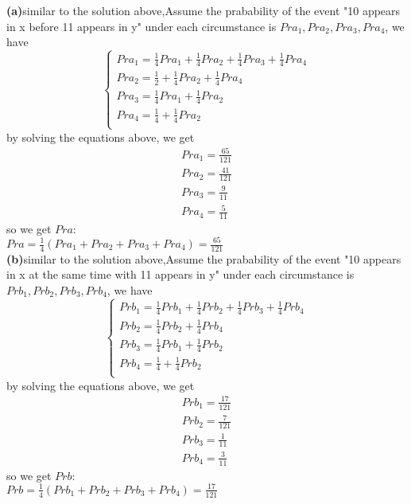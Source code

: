 \documentclass{article} %
\begin{document}
	\textbf{(a)}similar to the solution above,Assume the prabability of the event "10 appears in x before 11 appears in y" under each circumstance is $Pra_1,Pra_2,Pra_3,Pra_4$, we have
	$$
	\begin{cases}
	Pra_1=\frac{1}{4}Pra_1+\frac{1}{4}Pra_2+\frac{1}{4}Pra_3+\frac{1}{4}Pra_4\\
	Pra_2=\frac{1}{2}+\frac{1}{4}Pra_2+\frac{1}{4}Pra_4\\
	Pra_3=\frac{1}{4}Pra_1+\frac{1}{4}Pra_2\\
	Pra_4=\frac{1}{4}+\frac{1}{4}Pra_2\\
	\end{cases}
	$$
	by solving the equations above, we get
	\begin{equation*}
	\begin{split}
	Pra_1=\frac{65}{121}\\
	Pra_2=\frac{41}{121}\\
	Pra_3=\frac{9}{11}\\
	Pra_4=\frac{5}{11}
	\end{split}
	\end{equation*}
	so we get $Pra$:\\
	$Pra=\frac{1}{4}(Pra_1+Pra_2+Pra_3+Pra_4) = \frac{65}{121} $\\
	
	\textbf{(b)}similar to the solution above,Assume the prabability of the event "10 appears in x at the same time with 11 appears in y" under each circumstance is $Prb_1,Prb_2,Prb_3,Prb_4$, we have
	$$
	\begin{cases}
	Prb_1=\frac{1}{4}Prb_1+\frac{1}{4}Prb_2+\frac{1}{4}Prb_3+\frac{1}{4}Prb_4\\
	Prb_2=\frac{1}{4}Prb_2+\frac{1}{4}Prb_4\\
	Prb_3=\frac{1}{4}Prb_1+\frac{1}{4}Prb_2\\
	Prb_4=\frac{1}{4}+\frac{1}{4}Prb_2\\
	\end{cases}
	$$
	by solving the equations above, we get
	\begin{equation*}
	\begin{split}
	Prb_1=\frac{17}{121}\\
	Prb_2=\frac{7}{121}\\
	Prb_3=\frac{1}{11}\\
	Prb_4=\frac{3}{11}
	\end{split}
	\end{equation*}
	so we get $Prb$:\\
	$Prb=\frac{1}{4}(Prb_1+Prb_2+Prb_3+Prb_4) = \frac{17}{121} $\\
	
\end{document}
